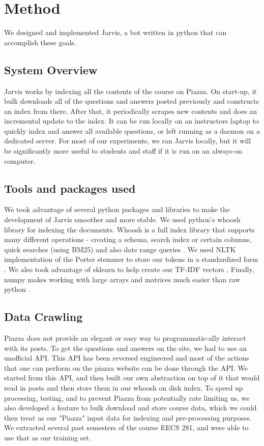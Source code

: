 \documentclass[sigconf]{acmart}
\begin{document}
\section{Method}
We designed and implemented Jarvis, a bot written in python that can accomplish these goals. 

\subsection{System Overview}
Jarvis works by indexing all the contents of the course on Piazza. On start-up, it bulk downloads all of the questions and answers posted previously and constructs an index from there. After that, it periodically scrapes new contents and does an incremental update to the index. It can be run locally on an instructors laptop to quickly index and answer all available questions, or left running as a daemon on a dedicated server. For most of our experiments, we ran Jarvis locally, but it will be significantly more useful to students and staff if it is run on an always-on computer.

\subsection{Tools and packages used}
We took advantage of several python packages and libraries to make the development of Jarvis smoother and more stable. We used python's whoosh library for indexing the documents. Whoosh is a full index library that supports many different operations - creating a schema, search index or certain columns, quick searches (using BM25) and also date range queries \cite{pythonwhoosh}. We used NLTK implementation of the Porter stemmer to store our tokens in a standardized form \cite{nltk}. We also took advantage of sklearn to help create our TF-IDF vectors \cite{sklearn}. Finally, numpy makes working with large arrays and matrices much easier than raw python \cite{numpy}.

\subsection{Data Crawling}
Piazza does not provide an elegant or easy way to programmatic-ally interact with its posts. To get the questions and answers on the site, we had to use an unofficial API. This API has been reversed engineered \cite{piazzaapi} and most of the actions that one can perform on the piazza website can be done through the API. We started from this API, and then built our own abstraction on top of it that would read in posts and then store them in our whoosh on disk index. To speed up processing, testing, and to prevent Piazza from potentially rate limiting us, we also developed a feature to bulk download and store course data, which we could then treat as our "Piazza" input data for indexing and pre-processing purposes. We extracted several past semesters of the course EECS 281, and were able to use that as our training set.
\end{document}
